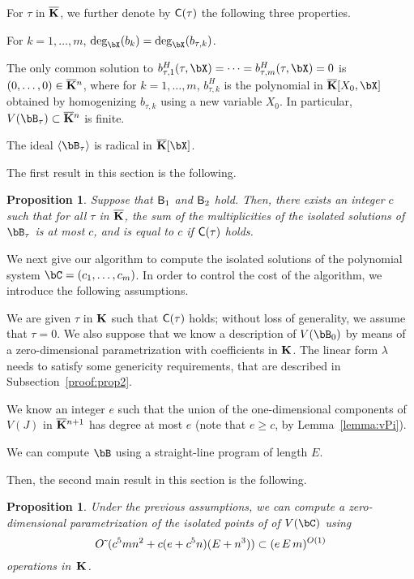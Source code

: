 \documentclass[12pt]{article}
\newtheorem{proposition}[definition]{Proposition}
\begin{document}
For $\tau$ in $\overline{\mathbf{K}}$, we further denote by $\mathsf{C}(\tau)$ the
following three properties.
\begin{description}[leftmargin=*]
\item[$\assG_1(\tau).$] For $k=1,\dots,m$,
  $\deg_\bX(b_k)=\deg_\bX(b_{\tau,k})$.
\item[$\assG_2(\tau).$] The only common solution to
  $b_{\tau,1}^H(\tau,\bX)=\cdots=b_{\tau,m}^H(\tau,\bX)=0$ is
  $(0,\dots,0)\in\overline{\mathbf{K}}{}^n$, where for $k=1,\dots,m$, $b_{\tau,k}^H$ is
  the polynomial in $\KKbar[X_0,\bX]$ obtained by homogenizing
  $b_{\tau,k}$ using a new variable $X_0$. In particular, $V(\bB_\tau)
  \subset \KKbar{}^n$ is finite.
\item[$\assG_3(\tau).$] The ideal $\langle \bB_\tau \rangle$ is
  radical in $\KKbar[\bX]$.
\end{description}

The first result in this section is the following.
\begin{proposition}\label{prop:degree_fiber}
  Suppose that $\mathsf{B}_1$ and $\mathsf{B}_2$ hold. Then, there exists an
  integer $c$ such that for all $\tau$ in $\overline{\mathbf{K}}$, the sum of the
  multiplicities of the isolated solutions of $\bB_\tau$ is at most
  $c$, and is equal to $c$ if $\mathsf{C}(\tau)$ holds.
\end{proposition}


We next give our algorithm to compute the isolated solutions of the
polynomial system $\bC=(c_1,\dots,c_m)$. In order to control the cost
of the algorithm, we introduce the following assumptions.
\begin{description}[leftmargin=*]
\item[${\assD}_1$.] We are given $\tau$ in $\mathbf{K}$ such that $\mathsf{C}(\tau)$
  holds; without loss of generality, we assume that $\tau=0$. We also
  suppose that we know a description of $V(\bB_{0})$ by means of a
  zero-dimensional parametrization with
  coefficients in $\mathbf{K}$. The linear form $\lambda$ needs to satisfy
  some genericity requirements, that are described in
  Subsection~\ref{proof:prop2}.
\item[${\assD}_2$.] We know an integer $e$ such that the union of the
  one-dimensional components of $V(J)$ in $\overline{\mathbf{K}}{}^{n+1}$ has degree
  at most $e$ (note that $e \ge c$, by Lemma~\ref{lemma:vPi}).
\item[${\assD}_3$.] We can compute $\bB$ using a straight-line program
  of length $E$.
\end{description}
Then, the second main result in this section is the following.
\begin{proposition}\label{prop:compute_isolated}
  Under the previous assumptions, we can compute a zero-dimensional
  parametrization of the isolated points of 
 of $V(\bC)$ using
$${O}{\,\tilde{ }\,}(c^5 m n^2  + c(e+c^5 n)(E + n^3)) \subset (e\,E\,m)^{O(1)}$$ operations in~$\mathbf{K}$.
\end{proposition}
\end{document}
